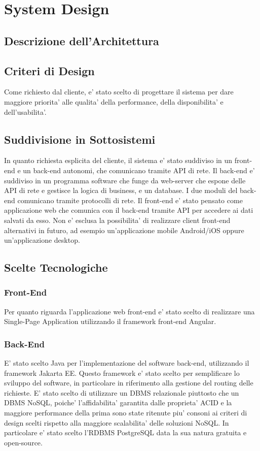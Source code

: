 \chapter{System Design}

\section{Descrizione dell'Architettura}
\section{Criteri di Design}
Come richiesto dal cliente, e' stato scelto di progettare il sistema per dare maggiore priorita' alle qualita' della performance, della disponibilita' e dell'usabilita'.
\section{Suddivisione in Sottosistemi}
In quanto richiesta esplicita del cliente, il sistema e' stato suddiviso in un front-end e un back-end autonomi, che comunicano tramite API di rete. Il back-end e' suddiviso in un programma software che funge da web-server che espone delle API di rete e gestisce la logica di business, e un database. I due moduli del back-end comunicano tramite protocolli di rete. Il front-end e' stato pensato come applicazione web che comunica con il back-end tramite API per accedere ai dati salvati da esso. Non e' esclusa la possibilita' di realizzare client front-end alternativi in futuro, ad esempio un'applicazione mobile Android/iOS oppure un'applicazione desktop.
\section{Scelte Tecnologiche}
\subsection{Front-End}
Per quanto riguarda l'applicazione web front-end e' stato scelto di realizzare una Single-Page Application utilizzando il framework front-end Angular.
\subsection{Back-End}
E' stato scelto Java per l'implementazione del software back-end, utilizzando il framework Jakarta EE. Questo framework e' stato scelto per semplificare lo sviluppo del software, in particolare in riferimento alla gestione del routing delle richieste. E' stato scelto di utilizzare un DBMS relazionale piuttosto che un DBMS NoSQL, poiche' l'affidabilita' garantita dalle proprieta' ACID e la maggiore performance della prima sono state ritenute piu' consoni ai criteri di design scelti rispetto alla maggiore scalabilita' delle soluzioni NoSQL. In particolare e' stato scelto l'RDBMS PostgreSQL data la sua natura gratuita e open-source. 
